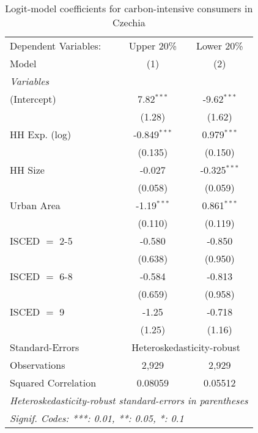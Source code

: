 
\begin{table}[htbp!]
   \centering
   \small
   \begin{adjustbox}{width = 1\textwidth, max height = 0.95\textheight, center}
      \begin{threeparttable}[b]
         \caption{\label{tab:Logit_1_CZE} Logit-model coefficients for carbon-intensive consumers in Czechia}
         \begin{tabular}{lcc}
            \tabularnewline \midrule \midrule
            Dependent Variables: & Upper 20\%     & Lower 20\%\\   
            Model                & (1)            & (2)\\  
            \midrule
            \emph{Variables}\\
            (Intercept)          & 7.82$^{***}$   & -9.62$^{***}$\\   
                                 & (1.28)         & (1.62)\\   
            HH Exp. (log)        & -0.849$^{***}$ & 0.979$^{***}$\\   
                                 & (0.135)        & (0.150)\\   
            HH Size              & -0.027         & -0.325$^{***}$\\   
                                 & (0.058)        & (0.059)\\   
            Urban Area           & -1.19$^{***}$  & 0.861$^{***}$\\   
                                 & (0.110)        & (0.119)\\   
            ISCED $=$ 2-5        & -0.580         & -0.850\\   
                                 & (0.638)        & (0.950)\\   
            ISCED $=$ 6-8        & -0.584         & -0.813\\   
                                 & (0.659)        & (0.958)\\   
            ISCED $=$ 9          & -1.25          & -0.718\\   
                                 & (1.25)         & (1.16)\\   
            \midrule 
            Standard-Errors & \multicolumn{2}{c}{Heteroskedasticity-robust} \\ 
            Observations         & 2,929          & 2,929\\  
            Squared Correlation  & 0.08059        & 0.05512\\  
            \midrule \midrule
            \multicolumn{3}{l}{\emph{Heteroskedasticity-robust standard-errors in parentheses}}\\
            \multicolumn{3}{l}{\emph{Signif. Codes: ***: 0.01, **: 0.05, *: 0.1}}\\
         \end{tabular}
         

\end{threeparttable}
\end{adjustbox}
\end{table}
